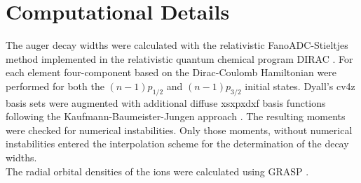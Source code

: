 \section{Computational Details}
\label{section:computational}
The auger decay widths were calculated with the relativistic FanoADC-Stieltjes
method
implemented in the relativistic quantum chemical program DIRAC \cite{DIRAC17}.
For each element four-component based on the Dirac-Coulomb Hamiltonian were
performed for both the $(n-1)p_{1/2}$ and $(n-1)p_{3/2}$ initial states.
Dyall's cv4z basis sets \cite{Dyall4s-7s09} were augmented with additional diffuse
xsxpxdxf
basis functions following the Kaufmann-Baumeister-Jungen approach
\cite{Kaufmann89}.
The resulting moments were checked for numerical instabilities.
Only those moments, without numerical instabilities entered the interpolation
scheme for the determination of the decay widths.\\
The radial orbital densities of the ions were calculated using GRASP
\cite{Parpia96,xyz}.
